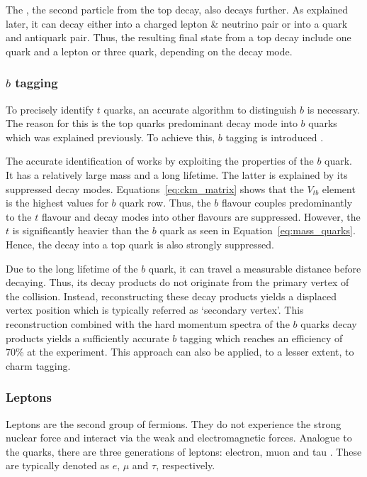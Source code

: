 \documentclass[bachelor,ngerman,english]{GAUBM}
\begin{document}
The \wboson, the second particle from the top decay, also decays further. As explained later, it can decay either into a charged lepton \& neutrino pair or into a quark and antiquark pair. Thus, the resulting final state from a top decay include one quark and a lepton or three quark, depending on the \wboson decay mode. 

\subsubsection*{$b$ tagging}
To precisely identify $t$ quarks, an accurate algorithm to distinguish $b$ is necessary. The reason for this is the top quarks predominant decay mode into $b$ quarks which was explained previously. To achieve this, $b$ tagging is introduced \cite{btag:atlas,btag:cms}.

The accurate identification of works by exploiting the properties of the $b$ quark. It has a relatively large mass and a long lifetime. The latter is explained by its suppressed decay modes. Equations~\ref{eq:ckm_matrix} shows that the $V_{tb}$ element is the highest values for $b$ quark row. Thus, the $b$ flavour couples predominantly to the $t$ flavour and decay modes into other flavours are suppressed. However, the $t$ is significantly heavier than the $b$ quark as seen in Equation~\ref{eq:mass_quarks}. Hence, the decay into a top quark is also strongly suppressed.

Due to the long lifetime of the $b$ quark, it can travel a measurable distance before decaying. Thus, its decay products do not originate from the primary vertex of the collision. Instead, reconstructing these decay products yields a displaced vertex position which is typically referred as `secondary vertex'. This reconstruction combined with the hard momentum spectra of the $b$ quarks decay products yields a sufficiently accurate $b$ tagging which reaches an efficiency of 70\% \cite{btag:performance} at the \atlas experiment. This approach can also be applied, to a lesser extent, to charm tagging. 


\subsubsection*{Leptons}
Leptons are the second group of fermions. They do not experience the strong nuclear force and interact via the weak and electromagnetic forces. Analogue to the quarks, there are three generations of leptons: electron, muon and tau \cite{theory:general_sm}. These are typically denoted as $e$, $\mu$ and $\tau$, respectively.
\end{document}
